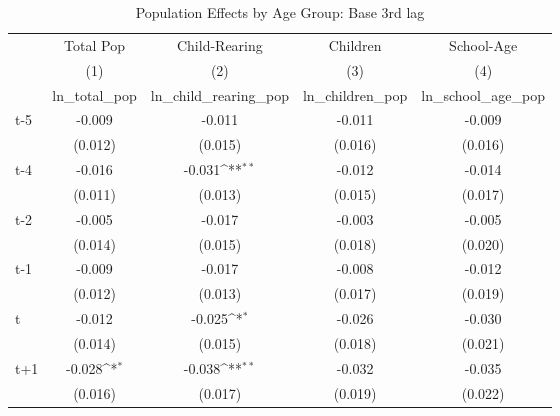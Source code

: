 \begin{table}[htbp]\centering
\def\sym#1{\ifmmode^{#1}\else\(^{#1}\)\fi}
\caption{Population Effects by Age Group: Base 3rd lag}
\begin{tabular}{l*{4}{c}}
\hline\hline
            &\multicolumn{1}{c}{Total Pop}&\multicolumn{1}{c}{Child-Rearing}&\multicolumn{1}{c}{Children}&\multicolumn{1}{c}{School-Age}\\\cmidrule(lr){2-2}\cmidrule(lr){3-3}\cmidrule(lr){4-4}\cmidrule(lr){5-5}
            &\multicolumn{1}{c}{(1)}&\multicolumn{1}{c}{(2)}&\multicolumn{1}{c}{(3)}&\multicolumn{1}{c}{(4)}\\
            &\multicolumn{1}{c}{ln\_total\_pop}&\multicolumn{1}{c}{ln\_child\_rearing\_pop}&\multicolumn{1}{c}{ln\_children\_pop}&\multicolumn{1}{c}{ln\_school\_age\_pop}\\
\hline
t-5         &      -0.009         &      -0.011         &      -0.011         &      -0.009         \\
            &     (0.012)         &     (0.015)         &     (0.016)         &     (0.016)         \\
[1em]
t-4         &      -0.016         &      -0.031\sym{**} &      -0.012         &      -0.014         \\
            &     (0.011)         &     (0.013)         &     (0.015)         &     (0.017)         \\
[1em]
t-2         &      -0.005         &      -0.017         &      -0.003         &      -0.005         \\
            &     (0.014)         &     (0.015)         &     (0.018)         &     (0.020)         \\
[1em]
t-1         &      -0.009         &      -0.017         &      -0.008         &      -0.012         \\
            &     (0.012)         &     (0.013)         &     (0.017)         &     (0.019)         \\
[1em]
t           &      -0.012         &      -0.025\sym{*}  &      -0.026         &      -0.030         \\
            &     (0.014)         &     (0.015)         &     (0.018)         &     (0.021)         \\
[1em]
t+1         &      -0.028\sym{*}  &      -0.038\sym{**} &      -0.032         &      -0.035         \\
            &     (0.016)         &     (0.017)         &     (0.019)         &     (0.022)         \\

\end{tabular}
\end{table}
